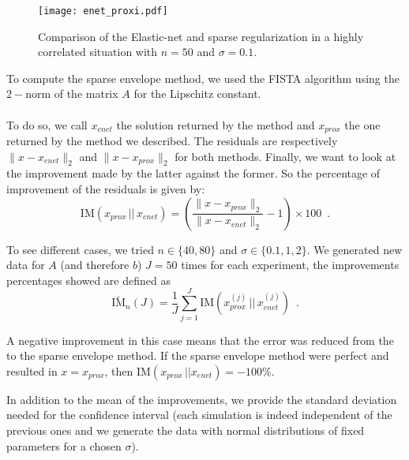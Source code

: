 \begin{center}
    \begin{figure}[H]
        \centering
        \texttt{[image: enet\_proxi.pdf]}
        \caption{Comparison of the Elastic-net and sparse regularization in a highly correlated situation with $n=50$ and $\sigma=0.1$.}
        \label{fig:enet_sp}
    \end{figure}
\end{center}

\begin{remark}
To compute the sparse envelope method, we used the FISTA algorithm using the $2-$norm of the matrix $A$ for the Lipschitz constant.
\end{remark}

\paragraph*{}
To do so, we call $x_{enet}$ the solution returned by the \enet method and $x_{prox}$ the one returned by the method we described. The residuals are respectively $\|x-x_{enet}\|_2$ and $\|x-x_{prox}\|_2$ for both methods. Finally, we want to look at the improvement made by the latter against the former. So the percentage of improvement of the residuals is given by:
\[\mathrm{IM}(x_{prox}\,||\,x_{enet})=\left(\frac{\|x-x_{prox}\|_2}{\|x-x_{enet}\|_2} - 1 \right) \times 100\enspace.\]

To see different cases, we tried $n\in\{40, 80\}$ and $\sigma\in\{0.1,1,2\}$.
We generated new data for $A$ (and therefore $b$) $J=50$ times for each experiment, the improvements percentages showed are defined as
\[\bar{\mathrm{IM}}_{n}(J) = \frac{1}{J}\sum_{j=1}^J \mathrm{IM}(x_{prox}^{(j)}\,||\, x_{enet}^{(j)})\enspace.\]

\begin{remark}
A negative improvement in this case means that the error was reduced from the \enet to the sparse envelope method. If the sparse envelope method were perfect and resulted in $x=x_{prox}$, then $\mathrm{IM}(x_{prox}\,||x_{enet})=-100\%$. \end{remark}

In addition to the mean of the improvements, we provide the standard deviation needed for the confidence interval (each simulation is indeed independent of the previous ones and we generate the data with normal distributions of fixed parameters for a chosen $\sigma$).

